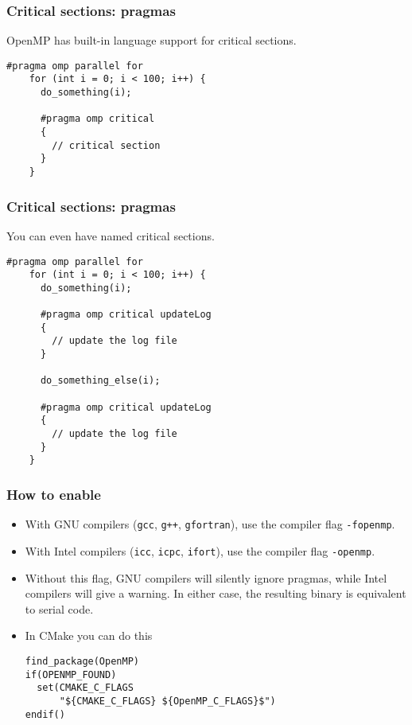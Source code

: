 \begin{frame}[fragile]
  \frametitle{Critical sections: pragmas}
  OpenMP has built-in language support for critical sections.
  \begin{lstlisting}[style=c]
    #pragma omp parallel for
    for (int i = 0; i < 100; i++) {
      do_something(i);

      #pragma omp critical
      {
        // critical section
      }
    }
  \end{lstlisting}
\end{frame}

\begin{frame}[fragile]
  \frametitle{Critical sections: pragmas}
  You can even have named critical sections.
  \begin{lstlisting}[style=c, basicstyle=\ttfamily\footnotesize]
    #pragma omp parallel for
    for (int i = 0; i < 100; i++) {
      do_something(i);

      #pragma omp critical updateLog
      {
        // update the log file
      }

      do_something_else(i);

      #pragma omp critical updateLog
      {
        // update the log file
      }
    }
  \end{lstlisting}
\end{frame}

\begin{frame}[fragile]
  \frametitle{How to enable}
  \begin{itemize}
  \item With GNU compilers (\texttt{gcc}, \texttt{g++}, \texttt{gfortran}), use
    the compiler flag \texttt{-fopenmp}.
  \item With Intel compilers (\texttt{icc}, \texttt{icpc}, \texttt{ifort}), use
    the compiler flag \texttt{-openmp}.
  \item Without this flag, GNU compilers will silently ignore pragmas, while
    Intel compilers will give a warning. In either case, the resulting binary is
    equivalent to serial code.
  \item In CMake you can do this
    \begin{lstlisting}[basicstyle=\ttfamily\footnotesize]
find_package(OpenMP)
if(OPENMP_FOUND)
  set(CMAKE_C_FLAGS
      "${CMAKE_C_FLAGS} ${OpenMP_C_FLAGS}$")
endif()
    \end{lstlisting}
  \end{itemize}
\end{frame}

